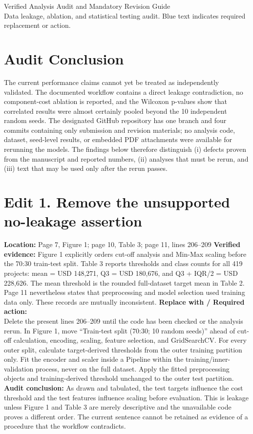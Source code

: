\documentclass[11pt]{article}
\newcommand{\loc}[1]{\textbf{Location:} #1}
\newcommand{\current}[1]{\textbf{Verified evidence:} #1}
\newcommand{\replacewith}[1]{\textbf{Replace with / Required action:}\\{\color{blue}#1}}
\newcommand{\why}[1]{\textbf{Audit conclusion:} #1}
\begin{document}
\begin{center}
{\Large Verified Analysis Audit and Mandatory Revision Guide}\\
{\small Data leakage, ablation, and statistical testing audit. Blue text indicates required replacement or action.}
\end{center}

\section*{Audit Conclusion}
The current performance claims cannot yet be treated as independently validated. The documented workflow contains a direct leakage contradiction, no component-cost ablation is reported, and the Wilcoxon p-values show that correlated results were almost certainly pooled beyond the 10 independent random seeds. The designated GitHub repository has one branch and four commits containing only submission and revision materials; no analysis code, dataset, seed-level results, or embedded PDF attachments were available for rerunning the models. The findings below therefore distinguish (i) defects proven from the manuscript and reported numbers, (ii) analyses that must be rerun, and (iii) text that may be used only after the rerun passes.

\section*{Edit 1. Remove the unsupported no-leakage assertion}
\loc{Page 7, Figure 1; page 10, Table 3; page 11, lines 206--209}
\current{Figure 1 explicitly orders cut-off analysis and Min-Max scaling before the 70:30 train-test split. Table 3 reports thresholds and class counts for all 419 projects: mean = USD 148,271, Q3 = USD 180,676, and Q3 + IQR/2 = USD 228,626. The mean threshold is the rounded full-dataset target mean in Table 2. Page 11 nevertheless states that preprocessing and model selection used training data only. These records are mutually inconsistent.}
\replacewith{Delete the present lines 206--209 until the code has been checked or the analysis rerun. In Figure 1, move ``Train-test split (70:30; 10 random seeds)'' ahead of cut-off calculation, encoding, scaling, feature selection, and GridSearchCV. For every outer split, calculate target-derived thresholds from the outer training partition only. Fit the encoder and scaler inside a Pipeline within the training/inner-validation process, never on the full dataset. Apply the fitted preprocessing objects and training-derived threshold unchanged to the outer test partition.}
\why{As drawn and tabulated, the test targets influence the cost threshold and the test features influence scaling before evaluation. This is leakage unless Figure 1 and Table 3 are merely descriptive and the unavailable code proves a different order. The current sentence cannot be retained as evidence of a procedure that the workflow contradicts.}
\end{document}
